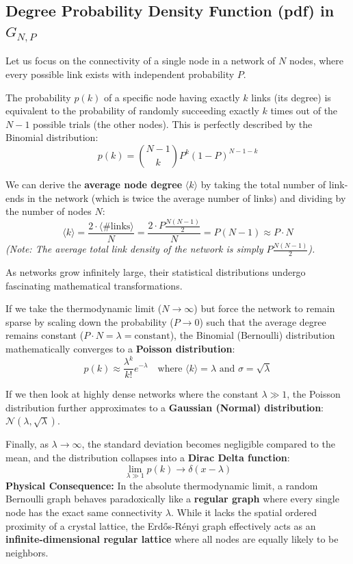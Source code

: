 \subsection{Degree Probability Density Function (pdf) in \( G_{N,P} \)}

Let us focus on the connectivity of a single node in a network of \( N \) nodes, where every possible link exists with independent probability \( P \).

The probability \( p(k) \) of a specific node having exactly \( k \) links (its degree) is equivalent to the probability of randomly succeeding exactly \( k \) times out of the \( N-1 \) possible trials (the other nodes). This is perfectly described by the Binomial distribution:
\[
    p(k) = \binom{N-1}{k} P^k (1-P)^{N-1-k}
\]

We can derive the \textbf{average node degree} \( \langle k \rangle \) by taking the total number of link-ends in the network (which is twice the average number of links) and dividing by the number of nodes \( N \):
\[
    \langle k \rangle = \frac{2 \cdot \langle \#\text{links} \rangle}{N} = \frac{2 \cdot P \frac{N(N-1)}{2}}{N} = P(N-1) \approx P \cdot N
\]
\textit{(Note: The average total link density of the network is simply \( P \frac{N(N-1)}{2} \)).}

\begin{remark}
    As networks grow infinitely large, their statistical distributions undergo fascinating mathematical transformations.

    If we take the thermodynamic limit (\( N \to \infty \)) but force the network to remain sparse by scaling down the probability (\( P \to 0 \)) such that the average degree remains constant (\( P \cdot N = \lambda = \text{constant} \)), the Binomial (Bernoulli) distribution mathematically converges to a \textbf{Poisson distribution}:
    \[
        p(k) \approx \frac{\lambda^k}{k!} e^{-\lambda} \quad \text{where } \langle k \rangle = \lambda \text{ and } \sigma = \sqrt{\lambda}
    \]

    If we then look at highly dense networks where the constant \( \lambda \gg 1 \), the Poisson distribution further approximates to a \textbf{Gaussian (Normal) distribution}: \( \mathcal{N}(\lambda, \sqrt{\lambda}) \).

    Finally, as \( \lambda \to \infty \), the standard deviation becomes negligible compared to the mean, and the distribution collapses into a \textbf{Dirac Delta function}:
    \[
        \lim_{\lambda \gg 1} p(k) \to \delta(x - \lambda)
    \]
    \textbf{Physical Consequence:} In the absolute thermodynamic limit, a random Bernoulli graph behaves paradoxically like a \textbf{regular graph} where every single node has the exact same connectivity \( \lambda \). While it lacks the spatial ordered proximity of a crystal lattice, the Erdős-Rényi graph effectively acts as an \textbf{infinite-dimensional regular lattice} where all nodes are equally likely to be neighbors.
\end{remark}

